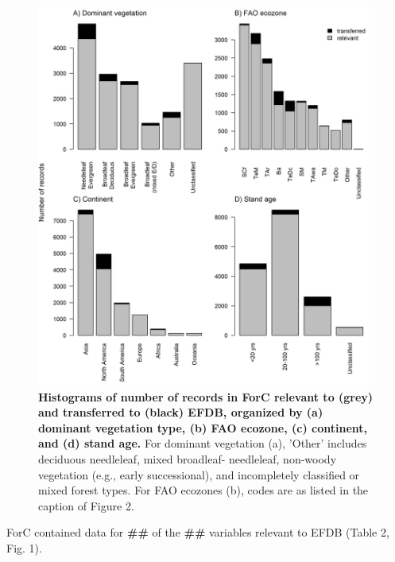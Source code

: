 \documentclass[, manuscript]{copernicus}
\begin{document}
\begin{figure}
\includegraphics[width=15cm]{figures_tables/Histogram_n_Relevant_and_Transferred_Records} \caption{\textbf{Histograms of number of records in ForC relevant to (grey) and transferred to (black) EFDB, organized by (a) dominant vegetation type, (b) FAO ecozone, (c) continent, and (d) stand age.} For dominant vegetation (a), 'Other' includes deciduous needleleaf, mixed broadleaf- needleleaf, non-woody vegetation (e.g., early successional), and incompletely classified or mixed forest types. For FAO ecozones (b), codes are as listed in the caption of Figure 2.}\label{fig:fig_dominant_veg}
\end{figure}

ForC contained data for \textbf{\#\#} of the \textbf{\#\#} variables
relevant to EFDB (Table 2, Fig. 1).
\end{document}
